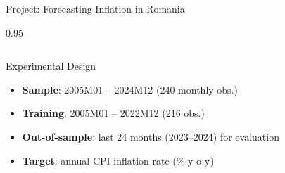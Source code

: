 \documentclass[9pt, aspectratio=169, t]{beamer}
\begin{document}
\begin{frame}{Project: Forecasting Inflation in Romania}
\begin{cminipage}{0.95\textwidth}
{\begin{columns}[T]
            \begin{alertblock}{Experimental Design}
                \begin{itemize}\setlength{\itemsep}{0pt}
                    \item \textbf{Sample}: 2005M01 -- 2024M12 (240 monthly obs.)
                    \item \textbf{Training}: 2005M01 -- 2022M12 (216 obs.)
                    \item \textbf{Out-of-sample}: last 24 months (2023--2024) for evaluation
                    \item \textbf{Target}: annual CPI inflation rate (\% y-o-y)
                \end{itemize}
            \end{alertblock}
        \end{columns}
        }
    \end{cminipage}
\end{frame}
\end{document}
